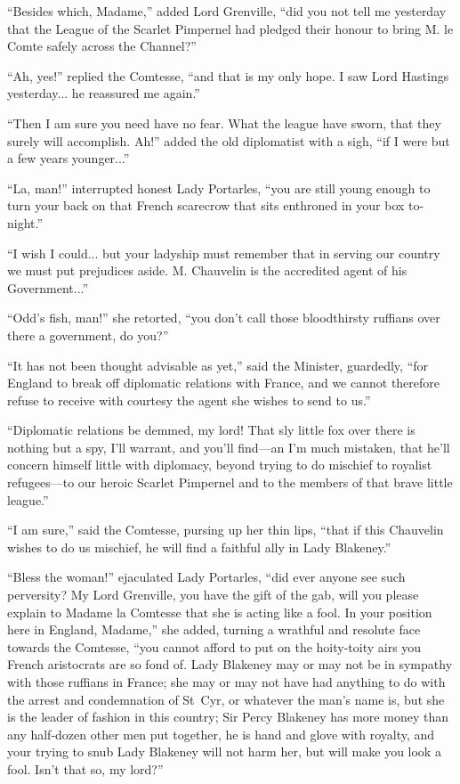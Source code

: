 \enquote{Besides which, Madame,} added Lord Grenville, \enquote{did you not tell me yesterday that the League of the Scarlet Pimpernel had pledged their honour to bring M. le Comte safely across the Channel?}

\enquote{Ah, yes!} replied the Comtesse, \enquote{and that is my only hope. I saw Lord Hastings yesterday... he reassured me again.}

\enquote{Then I am sure you need have no fear. What the league have sworn, that they surely will accomplish. Ah!} added the old diplomatist with a sigh, \enquote{if I were but a few years younger...}

\enquote{La, man!} interrupted honest Lady Portarles, \enquote{you are still young enough to turn your back on that French scarecrow that sits enthroned in your box to-night.}

\enquote{I wish I could... but your ladyship must remember that in serving our country we must put prejudices aside. M. Chauvelin is the accredited agent of his Government...}

\enquote{Odd's fish, man!} she retorted, \enquote{you don't call those bloodthirsty ruffians over there a government, do you?}

\enquote{It has not been thought advisable as yet,} said the Minister, guardedly, \enquote{for England to break off diplomatic relations with France, and we cannot therefore refuse to receive with courtesy the agent she wishes to send to us.}

\enquote{Diplomatic relations be demmed, my lord! That sly little fox over there is nothing but a spy, I'll warrant, and you'll find---an I'm much mistaken, that he'll concern himself little with diplomacy, beyond trying to do mischief to royalist refugees---to our heroic Scarlet Pimpernel and to the members of that brave little league.}

\enquote{I am sure,} said the Comtesse, pursing up her thin lips, \enquote{that if this Chauvelin wishes to do us mischief, he will find a faithful ally in Lady Blakeney.}

\enquote{Bless the woman!} ejaculated Lady Portarles, \enquote{did ever anyone see such perversity? My Lord Grenville, you have the gift of the gab, will you please explain to Madame la Comtesse that she is acting like a fool. In your position here in England, Madame,} she added, turning a wrathful and resolute face towards the Comtesse, \enquote{you cannot afford to put on the hoity-toity airs you French aristocrats are so fond of. Lady Blakeney may or may not be in sympathy with those ruffians in France; she may or may not have had anything to do with the arrest and condemnation of St~Cyr, or whatever the man's name is, but she is the leader of fashion in this country; Sir Percy Blakeney has more money than any half-dozen other men put together, he is hand and glove with royalty, and your trying to snub Lady Blakeney will not harm her, but will make you look a fool. Isn't that so, my lord?}

